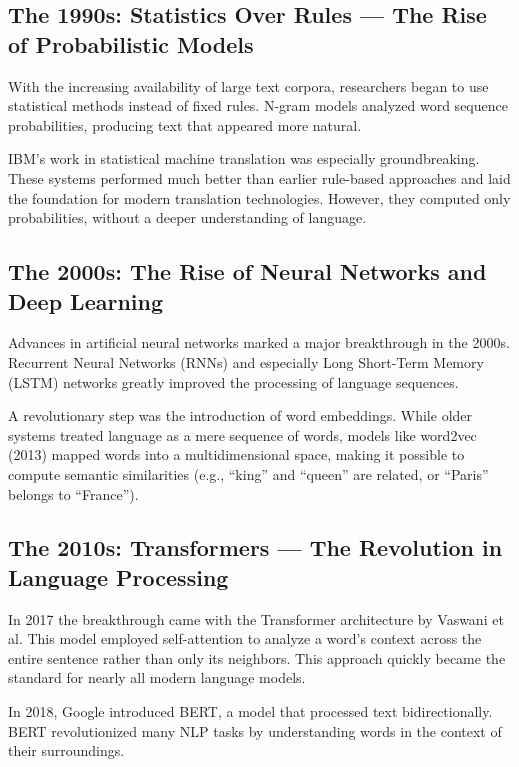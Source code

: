 \subsection{The 1990s: Statistics Over Rules --- The Rise of Probabilistic Models}

With the increasing availability of large text corpora, researchers began to use
statistical methods instead of fixed rules. N-gram models analyzed word sequence
probabilities, producing text that appeared more natural.

IBM’s work in statistical machine translation was especially groundbreaking.
These systems performed much better than earlier rule-based approaches and laid the
foundation for modern translation technologies. However, they computed only
probabilities, without a deeper understanding of language.

\subsection{The 2000s: The Rise of Neural Networks and Deep Learning}

Advances in artificial neural networks marked a major breakthrough in the 2000s.
Recurrent Neural Networks (RNNs) and especially Long Short-Term Memory (LSTM)
networks greatly improved the processing of language sequences.

A revolutionary step was the introduction of word embeddings. While older systems
treated language as a mere sequence of words, models like word2vec (2013) mapped words
into a multidimensional space, making it possible to compute semantic similarities
(e.g., “king” and “queen” are related, or “Paris” belongs to “France”).

\subsection{The 2010s: Transformers --- The Revolution in Language Processing}

In 2017 the breakthrough came with the Transformer architecture by Vaswani et al.
This model employed self-attention to analyze a word’s context across the entire
sentence rather than only its neighbors. This approach quickly became the standard
for nearly all modern language models.

In 2018, Google introduced BERT, a model that processed text bidirectionally.
BERT revolutionized many NLP tasks by understanding words in the context of their
surroundings.

